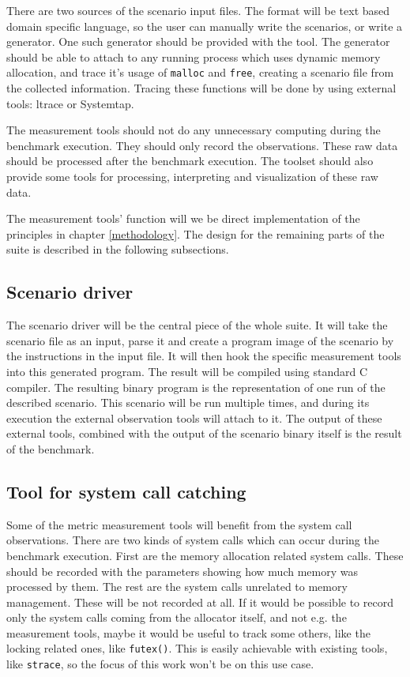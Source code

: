 There are two sources of the scenario input files. The format will be text based domain specific language, so the user can manually write the scenarios, or write a generator. One such generator should be provided with the tool. The generator should be able to attach to any running process which uses dynamic memory allocation, and trace it's usage of {\tt malloc} and {\tt free}, creating a scenario file from the collected information. Tracing these functions will be done by using external tools: ltrace or Systemtap.

The measurement tools should not do any unnecessary computing during the benchmark execution. They should only record the observations. These raw data should be processed after the benchmark execution. The toolset should also provide some tools for processing, interpreting and visualization of these raw data.

The measurement tools' function will we be direct implementation of the principles in chapter \ref{methodology}. The design for the remaining parts of the suite is described in the following subsections.

\subsection{Scenario driver}

The scenario driver will be the central piece of the whole suite. It will take the scenario file as an input, parse it and create a program image of the scenario by the instructions in the input file. It will then hook the specific measurement tools into this generated program. The result will be compiled using standard C compiler. The resulting binary program is the representation of one run of the described scenario. This scenario will be run multiple times, and during its execution the external observation tools will attach to it. The output of these external tools, combined with the output of the scenario binary itself is the result of the benchmark.

\subsection{Tool for system call catching}

Some of the metric measurement tools will benefit from the system call observations. There are two kinds of system calls which can occur during the benchmark execution. First are the memory allocation related system calls. These should be recorded with the parameters showing how much memory was processed by them. The rest are the system calls unrelated to memory management. These will be not recorded at all. If it would be possible to record only the system calls coming from the allocator itself, and not e.g. the measurement tools, maybe it would be useful to track some others, like the locking related ones, like {\tt futex()}. This is easily achievable with existing tools, like {\tt strace}, so the focus of this work won't be on this use case.

